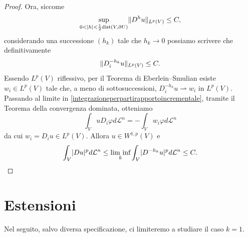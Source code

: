 \begin{teorema}
\begin{proof}
		Ora, siccome 
		\[ \underset{0 < \lvert h\rvert< \frac{1}{2}\textup{dist}(V,\partial U)}{\textup{sup}} \lVert D^hu\rVert_{L^p(V)} \le C, \]
		considerando una successione $(h_k)$ tale che $h_k \to 0$ possiamo scrivere che definitivamente
		\[ \lVert D^{-h_k}_iu\rVert_{L^p(V)} \le C. \]
		Essendo $L^p(V)$ riflessivo, per il Teorema di Eberlein--Smulian esiste $w_i \in L^p(V)$ tale che, a meno di sottosuccessioni, $D^{-h_k}_iu \rightharpoonup w_i$ in $L^p(V)$. Passando al limite in \eqref{integrazioneperpartirapportoincrementale}, tramite il Teorema della convergenza dominata, otteniamo 
		\[ \int_V uD_i \varphi d\mathcal{L}^n = -\int_V w_i \varphi d\mathcal{L}^n \]
		da cui $w_i = D_i u \in L^p(V)$. Allora $u \in W^{1,p}(V)$ e 
		\[ \int_V \lvert Du\rvert^pd\mathcal{L}^n \le \underset{k}{\textup{lim inf}} \int_V \lvert D^{-h_k}u\rvert^pd\mathcal{L}^n \le C.\qedhere\]
	\end{proof}
\end{teorema}
\section{Estensioni}
Nel seguito, salvo diversa specificazione, ci limiteremo a studiare il caso $k=1$.

